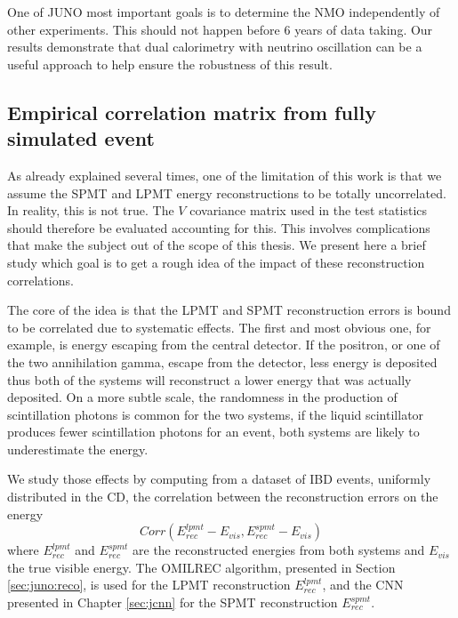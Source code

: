 \documentclass[../main.tex]{subfiles}
\begin{document}
One of JUNO most important goals is to determine the NMO independently of other experiments. This should not happen before 6 years of data taking. Our results demonstrate that dual calorimetry with neutrino oscillation can be a useful approach to help ensure the robustness of this result.

\subsection{Empirical correlation matrix from fully simulated event}

As already explained several times, one of the limitation of this work is that we assume the SPMT and LPMT energy reconstructions to be totally uncorrelated. In reality, this is not true. The $V$ covariance matrix used in the test statistics should therefore be evaluated accounting for this. This involves complications that make the subject out of the scope of this thesis. We present here a brief study which goal is to get a rough idea of the impact of these reconstruction correlations.

The core of the idea is that the LPMT and SPMT reconstruction errors is bound to be correlated due to systematic effects. The first and most obvious one, for example, is energy escaping from the central detector. If the positron, or one of the two annihilation gamma, escape from the detector, less energy is deposited thus both of the systems will reconstruct a lower energy that was actually deposited. On a more subtle scale, the randomness in the production of scintillation photons is common for the two systems, if the liquid scintillator produces fewer scintillation photons for an event, both systems are likely to underestimate the energy.

We study those effects by computing from a dataset of IBD events, uniformly distributed in the CD, the correlation between the reconstruction errors on the energy
\begin{equation}
  Corr(E^{lpmt}_{rec} - E_{vis}, E^{spmt}_{rec} - E_{vis})
\end{equation}
where $E^{lpmt}_{rec}$ and $E^{spmt}_{rec}$ are the reconstructed energies from both systems and $E_{vis}$ the true visible energy. The OMILREC algorithm, presented in Section \ref{sec:juno:reco}, is used for the LPMT reconstruction $E^{lpmt}_{rec}$, and the CNN presented in Chapter \ref{sec:jcnn} for the SPMT reconstruction $E^{spmt}_{rec}$.

\end{document}
